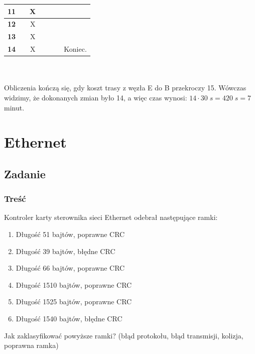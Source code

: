 \begin{tabular}{|c|c|c|c|c|c|p{7cm}|}
				\hline \textbf{11} & \color{red}{12} & X & \color{red}{12} & \color{red}{12} & \color{red}{12} &  \\ 
				\hline \textbf{12} & \color{red}{13} & X & \color{red}{13} & \color{red}{13} & \color{red}{13} &  \\ 
				\hline \textbf{13} & \color{red}{14} & X & \color{red}{14} & \color{red}{14} & \color{red}{14} &  \\ 
				\hline \textbf{14} & \color{red}{15} & X & \color{red}{15} & \color{red}{15} & \color{red}{15} &  Koniec. \\
				\hline 
			\end{tabular}\\\\
			Obliczenia kończą się, gdy koszt trasy z węzła E do B przekroczy 15. Wówczas widzimy, że dokonanych zmian było 14, a więc czas wynosi: $ 14\cdot 30\;s=420\;s=7$ minut.

\section{Ethernet}
	\subsection{Zadanie}
		\subsubsection{Treść}
			Kontroler karty sterownika sieci Ethernet odebrał następujące ramki:
			\begin{enumerate}
				\item Długość 51 bajtów, poprawne CRC
				\item Długość 39 bajtów, błędne CRC
				\item Długość 66 bajtów, poprawne CRC
				\item Długość 1510 bajtów, poprawne CRC
				\item Długość 1525 bajtów, poprawne CRC
				\item Długość 1540 bajtów, błędne CRC
			\end{enumerate}
			Jak zaklasyfikować powyższe ramki? (błąd protokołu, błąd transmisji, kolizja, poprawna ramka)
